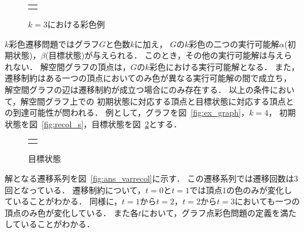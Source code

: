 \begin{figure}[tb]
  \centering
  \begin{tabular}{c}
    
    \begin{minipage}{0.45\hsize}
      \centering
      
      \caption{グラフ}
      \label{fig:ex_graph}
    \end{minipage}

    \begin{minipage}{0.45\hsize}
      \centering
      
      \caption{$k=3$における彩色例}
      \label{fig:graph_col}
    \end{minipage}

  \end{tabular}  
\end{figure}

$k$彩色遷移問題ではグラフ$G$と色数$k$に加え，
$G$の$k$彩色の二つの実行可能解$\alpha$(初期状態)，$\beta$(目標状態)が与えられる． 
このとき，その他の実行可能解は与えられない． 
解空間グラフの頂点は，$G$の$k$彩色における実行可能解となる．
また，遷移制約はある一つの頂点においてのみ色が異なる実行可能解の間で成立ち，
解空間グラフの辺は遷移制約が成立つ場合にのみ存在する．
以上の条件において，解空間グラフ上での
初期状態に対応する頂点と目標状態に対応する頂点との到達可能性が問われる． 
例として，グラフを図~\ref{fig:ex_graph}，$k=4$，
初期状態を図~\ref{fig:recol_s}，目標状態を図~\ref{fig:recol_g}とする．

\begin{figure}[tb]
  \centering
  \begin{tabular}{c}

    \begin{minipage}{0.45\hsize}
      \centering
      
      \caption{初期状態}
      \label{fig:recol_s}
    \end{minipage}

    \begin{minipage}{0.45\hsize}
      \centering
      
      \caption{目標状態}
      \label{fig:recol_g}
    \end{minipage}
    
  \end{tabular}
\end{figure}

解となる遷移系列を図~\ref{fig:ans_varrecol}に示す．
この遷移系列では遷移回数は3回となっている．
遷移制約について，$t=0$と$t=1$では頂点1の色のみが変化していることがわかる． 
同様に，$t=1$から$t=2$，$t=2$から$t=3$においても一つの頂点のみ色が変化している． 
また各$t$において，グラフ点彩色問題の定義を満たしていることがわかる．

